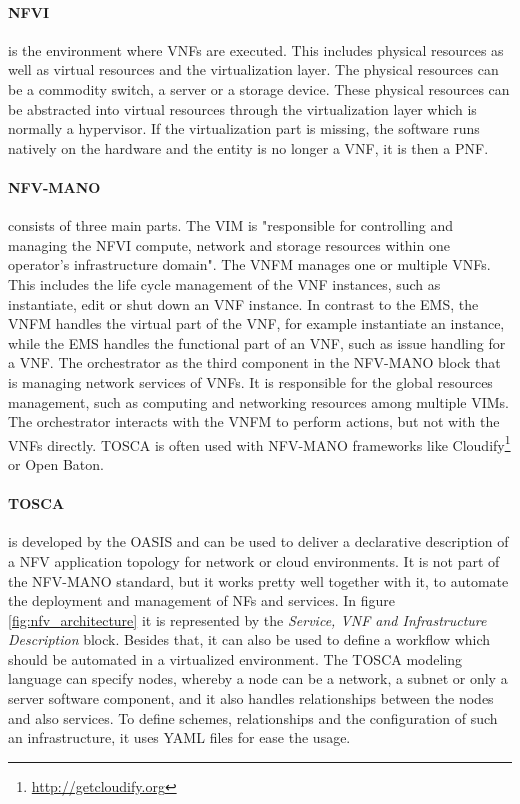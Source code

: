 \paragraph{\ac{NFVI}} is the environment where \acp{VNF} are executed.
This includes physical resources as well as virtual resources and the virtualization layer.
The physical resources can be a commodity switch, a server or a storage device.
These physical resources can be abstracted into virtual resources through the virtualization layer which is normally a hypervisor.
If the virtualization part is missing, the software runs natively on the hardware and the entity is no longer a \ac{VNF}, it is then a \ac{PNF}.\autocite[cf.]{Kahn:2015}

\paragraph{\ac{NFV-MANO}} consists of three main parts.
The \ac{VIM} is "responsible for controlling and managing the NFVI compute, network and storage resources within one operator’s infrastructure domain"\autocite{Kahn:2015}.
The \ac{VNFM} manages one or multiple \acp{VNF}.
This includes the life cycle management of the \ac{VNF} instances, such as instantiate, edit or shut down an \ac{VNF} instance.\autocite[cf.]{Tosca:NFV}
In contrast to the \ac{EMS}, the \ac{VNFM} handles the virtual part of the \ac{VNF}, for example instantiate an instance, while the \ac{EMS} handles the functional part of an \ac{VNF}, such as issue handling for a \ac{VNF}.
The orchestrator as the third component in the \ac{NFV-MANO} block that is managing network services of \acp{VNF}.
It is responsible for the global resources management, such as computing and networking resources among multiple \acp{VIM}.\autocite[cf.]{Kahn:2015}
The orchestrator interacts with the \ac{VNFM} to perform actions, but not with the \acp{VNF} directly.\autocite[cf.]{Kahn:2015}
\ac{TOSCA} is often used with \ac{NFV-MANO} frameworks like Cloudify\footnote{\url{http://getcloudify.org}} or Open Baton.\autocite[cf.]{Tosca:NFV}

\paragraph{\ac{TOSCA}} is developed by the \ac{OASIS} and can be used to deliver a declarative description of a \ac{NFV} application topology for network or cloud environments.\autocite[cf.]{Tosca:NFV}
It is not part of the \ac{NFV-MANO} standard, but it works pretty well together with it, to automate the deployment and management of \acp{NF} and services.
In figure \ref{fig:nfv_architecture} it is represented by the \textit{Service, VNF and Infrastructure Description} block.
Besides that, it can also be used to define a workflow which should be automated in a virtualized environment.\autocite[cf.]{Tosca:NFV}
The \ac{TOSCA} modeling language can specify nodes, whereby a node can be a network, a subnet or only a server software component, and it also handles relationships between the nodes and also services.\autocite[cf.]{Tosca:NFV}
To define schemes, relationships and the configuration of such an infrastructure, it uses \ac{YAML} files for ease the usage.\autocite[cf.]{Tosca:NFV}


